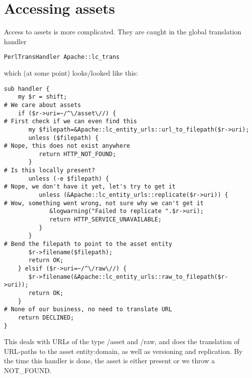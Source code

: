\section{Accessing assets}
Access to assets is more complicated. They are caught in the global translation handler
\begin{verbatim}
PerlTransHandler Apache::lc_trans
\end{verbatim}
which (at some point) looks/looked like this:
\begin{verbatim}
sub handler {
    my $r = shift;
# We care about assets
    if ($r->uri=~/^\/asset\//) {
# First check if we can even find this
       my $filepath=&Apache::lc_entity_urls::url_to_filepath($r->uri);
       unless ($filepath) {
# Nope, this does not exist anywhere
          return HTTP_NOT_FOUND;
       }
# Is this locally present?
       unless (-e $filepath) {
# Nope, we don't have it yet, let's try to get it
          unless (&Apache::lc_entity_urls::replicate($r->uri)) {
# Wow, something went wrong, not sure why we can't get it
             &logwarning("Failed to replicate ".$r->uri);
             return HTTP_SERVICE_UNAVAILABLE; 
          }
       }
# Bend the filepath to point to the asset entity
       $r->filename($filepath);
       return OK;
    } elsif ($r->uri=~/^\/raw\//) {
       $r->filename(&Apache::lc_entity_urls::raw_to_filepath($r->uri));
       return OK;
    } 
# None of our business, no need to translate URL
    return DECLINED; 
}
\end{verbatim}
This deals with URLs of the type /asset and /raw, and does the translation of URL-paths to the asset entity:domain, as well as versioning and replication. By the time this handler is done, the asset is either present or we throw a NOT\_FOUND.
